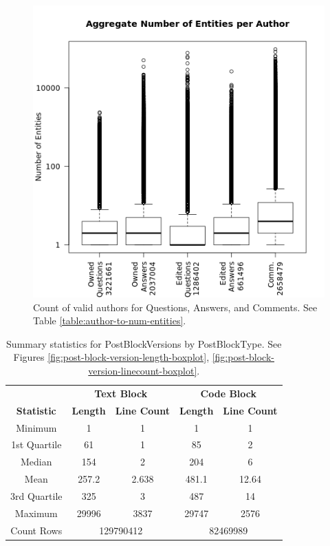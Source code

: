 \documentclass[a4paper,11pt, notitlepage]{report}
\theoremstyle{definition}
\numberwithin{equation}{section}		%
\begin{document}
\begin{figure}[ht]
    \centering
    \includegraphics[width=6in]{figures/num_entities_per_author.png}
    \caption{Count of valid authors for Questions, Answers, and Comments. See Table \ref{table:author-to-num-entities}.}
    \label{fig:author-to-num-entiies}
\end{figure}

\begin{table}[]
    \centering
    \begin{tabular}{c|cc|cc}
    \hline
    & \multicolumn{2}{c}{\textbf{Text Block}} & \multicolumn{2}{c}{\textbf{Code Block}} \\
    \textbf{Statistic} & \textbf{Length} & \textbf{Line Count} & \textbf{Length} & \textbf{Line Count} \\ \hline
    Minimum         & 1     & 1     & 1     & 1     \\
    1st Quartile    & 61    & 1     & 85    & 2     \\
    Median          & 154   & 2     & 204   & 6     \\
    Mean            & 257.2 & 2.638 & 481.1 & 12.64 \\
    3rd Quartile    & 325   & 3     & 487   & 14    \\
    Maximum         & 29996 & 3837  & 29747 & 2576  \\ \hline
    Count Rows      & \multicolumn{2}{c}{129790412} & \multicolumn{2}{c}{82469989} \\
    \end{tabular}
    \caption{Summary statistics for PostBlockVersions by PostBlockType. See Figures \ref{fig:post-block-version-length-boxplot}, \ref{fig:post-block-version-linecount-boxplot}.}
    \label{tab:post-block-version-stats}
\end{table}
\end{document}
